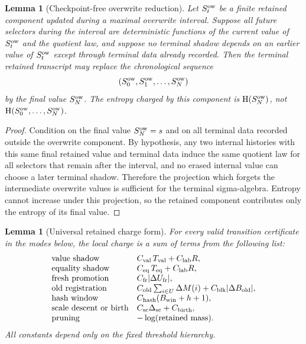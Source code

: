 \documentclass[11pt]{article}
\newtheorem{lemma}[theorem]{Lemma}
\theoremstyle{remark}
\newcommand{\HH}{\mathrm H}
\newcommand{\old}{\mathrm{old}}
\newcommand{\fr}{\mathrm{fr}}
\newcommand{\scal}{\mathrm{sc}}
\begin{document}
\begin{lemma}[Checkpoint-free overwrite reduction]\label{lem:app-overwrite}
Let $S_t^{\rm ow}$ be a finite retained component updated during a maximal overwrite interval.  Suppose all future selectors during the interval are deterministic functions of the current value of $S_t^{\rm ow}$ and the quotient law, and suppose no terminal shadow depends on an earlier value of $S_t^{\rm ow}$ except through terminal data already recorded.  Then the terminal retained transcript may replace the chronological sequence
\[
        (S_0^{\rm ow},S_1^{\rm ow},\ldots,S_N^{\rm ow})
\]
by the final value $S_N^{\rm ow}$.  The entropy charged by this component is $\HH(S_N^{\rm ow})$, not $\HH(S_0^{\rm ow},\ldots,S_N^{\rm ow})$.
\end{lemma}

\begin{proof}
Condition on the final value $S_N^{\rm ow}=s$ and on all terminal data recorded outside the overwrite component.  By hypothesis, any two internal histories with this same final retained value and terminal data induce the same quotient law for all selectors that remain after the interval, and no erased internal value can choose a later terminal shadow.  Therefore the projection which forgets the intermediate overwrite values is sufficient for the terminal sigma-algebra.  Entropy cannot increase under this projection, so the retained component contributes only the entropy of its final value.
\end{proof}

\begin{lemma}[Universal retained charge form]\label{lem:universal-charge}
For every valid transition certificate in the modes below, the local charge is a sum of terms from the following list:
\[
\begin{array}{ll}
\hbox{value shadow} & C_{\rm val}\,T_{\rm val}+C_{\rm lab}R,\\
\hbox{equality shadow} & C_{\rm eq}\,T_{\rm eq}+C_{\rm lab}R,\\
\hbox{fresh promotion} & C_{\fr}|\Delta U_{\fr}|,\\
\hbox{old registration} & C_{\old}\sum_{i\in U}\Delta M(i)+C_{\rm blk}|\Delta B_{\old}|,\\
\hbox{hash window} & C_{\rm hash}(B_{\rm win}+h+1),\\
\hbox{scale descent or birth} & C_{\scal}\Delta_{\scal}+C_{\rm birth},\\
\hbox{pruning} & -\log(\hbox{retained mass}).
\end{array}
\]
All constants depend only on the fixed threshold hierarchy.
\end{lemma}
\end{document}
